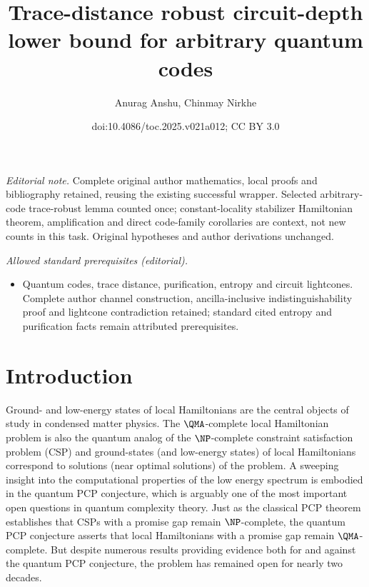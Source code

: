 \documentclass[11pt]{article}
\title{Trace-distance robust circuit-depth lower bound for arbitrary quantum codes}
\author{Anurag Anshu, Chinmay Nirkhe}
\date{doi:10.4086/toc.2025.v021a012; CC BY 3.0}
\begin{document}
\maketitle
\noindent\textit{Editorial note.} Complete original author mathematics, local proofs and bibliography retained, reusing the existing successful wrapper. Selected arbitrary-code trace-robust lemma counted once; constant-locality stabilizer Hamiltonian theorem, amplification and direct code-family corollaries are context, not new counts in this task. Original hypotheses and author derivations unchanged.\par\medskip
\noindent\textit{Allowed standard prerequisites (editorial).}\begin{itemize}
\item Quantum codes, trace distance, purification, entropy and circuit lightcones. Complete author channel construction, ancilla-inclusive indistinguishability proof and lightcone contradiction retained; standard cited entropy and purification facts remain attributed prerequisites.
\end{itemize}\medskip
\section{Introduction}

Ground- and low-energy states of local Hamiltonians are the central objects of study in condensed matter physics. The $\QMA$-complete local Hamiltonian problem is also the quantum analog of the $\NP$-complete constraint satisfaction problem (CSP) and ground-states (and low-energy states) of local Hamiltonians correspond to solutions (near optimal solutions) of the problem. A sweeping insight into the computational properties of the low energy spectrum is embodied in the quantum PCP conjecture, which is arguably one of the most important open questions in quantum complexity theory. Just as the classical PCP theorem establishes that CSPs with a promise gap remain $\NP$-complete, the quantum PCP conjecture asserts that local Hamiltonians with a promise gap remain $\QMA$-complete. But despite numerous results providing evidence both for \cite{10.1145/1536414.1536472,10.5555/2600498.2600507,8104078,nirkhe_et_al:LIPIcs:2018:9095,DBLP:conf/focs/NatarajanV18,Eldar2019RobustQE} and against \cite{10.5555/2011637.2011639,10.1145/2488608.2488719,10.1007/s11128-014-0877-9} the quantum PCP conjecture, the problem has remained open for nearly two decades. 
\end{document}
